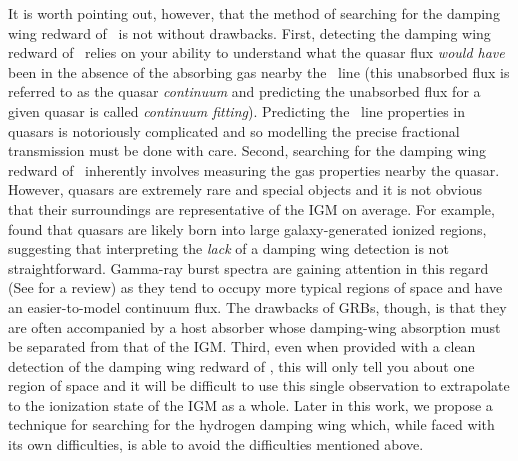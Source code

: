 It is worth pointing out, however, that the method of searching for the damping wing redward of \lya\ is not without drawbacks. First, detecting the damping wing redward of \lya\ relies on your ability to understand what the quasar flux \textit{would have} been in the absence of the absorbing gas nearby the \lya\ line (this unabsorbed flux is referred to as the quasar \textit{continuum} and predicting the unabsorbed flux for a given quasar is called \textit{continuum fitting}). Predicting the \lya\ line properties in quasars is notoriously complicated and so modelling the precise fractional transmission must be done with care. Second, searching for the damping wing redward of \lya\ inherently involves measuring the gas properties nearby the quasar. However, quasars are extremely rare and special objects and it is not obvious that their surroundings are representative of the IGM on average. For example, \citet{Lidz:2007mz} found that quasars are likely born into large galaxy-generated ionized regions, suggesting that interpreting the \textit{lack} of a damping wing detection is not straightforward. Gamma-ray burst spectra are gaining attention in this regard (See \citealt{Salvaterra:2015gpa} for a review) as they tend to occupy more typical regions of space and have an easier-to-model continuum flux. The drawbacks of GRBs, though, is that they are often accompanied by a host absorber whose damping-wing absorption must be separated from that of the IGM. Third, even when provided with a clean detection of the damping wing redward of \lya, this will only tell you about one region of space and it will be difficult to use this single observation to extrapolate to the ionization state of the IGM as a whole. Later in this work, we propose a technique for searching for the hydrogen damping wing which, while faced with its own difficulties, is able to avoid the difficulties mentioned above. 



\clearpage
